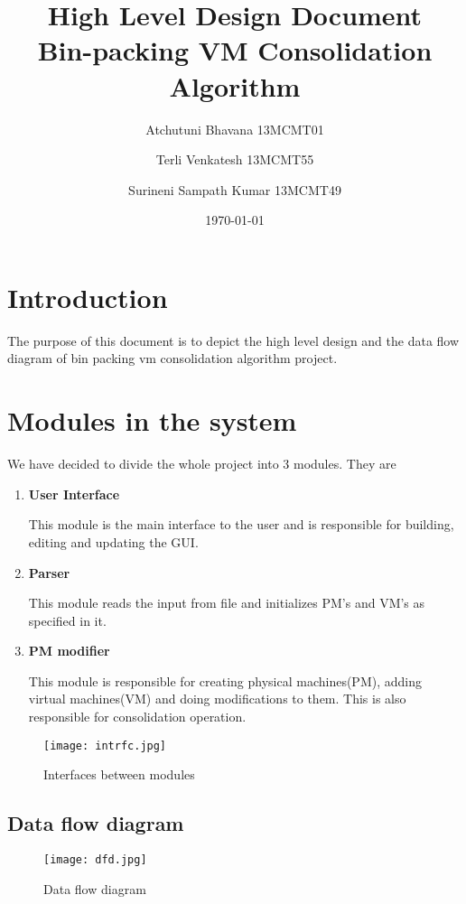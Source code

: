 \documentclass[a4paper,11pt]{article}
\title{High Level Design Document \\ Bin-packing VM Consolidation Algorithm}
\author{Atchutuni Bhavana 13MCMT01 \and Terli Venkatesh 13MCMT55 \and Surineni Sampath Kumar 13MCMT49}
\date{\today}
\begin{document}
\maketitle
\pagebreak
\tableofcontents
\pagebreak 

\section{Introduction}
The purpose of this document is to depict the high level
design and the data flow diagram of bin packing
vm consolidation algorithm project.
\section{Modules in the system}
We have decided to divide the whole project into 3 modules. They are
\begin{enumerate}
\item \textbf{ User Interface }

This module is the main interface to the user and  is responsible for building, editing and updating the GUI.
\item \textbf{ Parser }

This module reads the input from file and initializes PM’s and VM’s as specified in it.
\item \textbf{ PM modifier }

This module is responsible for creating physical machines(PM), adding virtual machines(VM) and doing modifications to them. This is also responsible for consolidation operation.  

\end{enumerate}

\begin{figure}[h]
\centering
\texttt{[image: intrfc.jpg]}
\caption{Interfaces between modules}
\label{fig:interfaces}

\end{figure}

\pagebreak
\subsection{Data flow diagram}

\begin{figure}[h]
\centering
\texttt{[image: dfd.jpg]}
\caption{Data flow diagram}
\label{fig:modules}

\end{figure}
\end{document}
